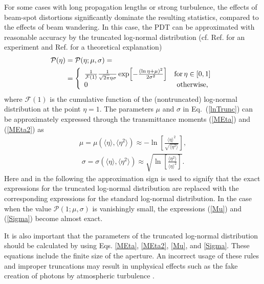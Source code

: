\documentclass[aps,pra,twocolumn,a4paper,nofootinbib,preprintnumbers] {revtex4-1}
\begin{document}
	For some cases with long propagation lengths or strong turbulence, the effects of beam-spot distortions significantly dominate  the resulting statistics, compared to the effects of beam wandering.
	In this case, the PDT can be approximated with  reasonable accuracy by the truncated log-normal distribution (cf. Ref. \cite{Capraro} for an experiment and Ref. \cite{Vasylyev2016} for a theoretical explanation)
		\begin{align}\label{lnTrunc}
		\mathcal{P}(\eta)&= \mathcal{P}(\eta;\mu,\sigma)=\nonumber\\
		&=\left\{\begin{array}{l c}
		\frac{1}{\mathcal{F}(1)}\frac{1}{\sqrt{2\pi}\eta\sigma}\exp\Bigl[-\frac{(\ln \eta+\mu )^2}{2\sigma^2}\Bigr]&\text{for}\,\eta\in[0,1]\\
		0&\text{otherwise,}
			\end{array}\right. 
		\end{align}
	where  $\mathcal{F}(1)$ is the cumulative function of the (nontruncated) log-normal distribution at the point $\eta{=}1$.
	The parameters $\mu$ and $\sigma$ in Eq.~(\ref{lnTrunc}) can be approximately expressed through the transmittance moments (\ref{MEta}) and (\ref{MEta2}) as
		\begin{align}\label{Mu}
		\mu=\mu(\langle\eta\rangle,\langle\eta^2\rangle)\approx-\ln\left[\frac{\langle\eta\rangle^2}{\sqrt{\langle\eta^2\rangle}}\right],
		\end{align}
		\begin{align}\label{Sigma}
		\sigma=\sigma(\langle\eta\rangle,\langle\eta^2\rangle)\approx\sqrt{\ln\left[\frac{\langle\eta^2\rangle}{\langle\eta\rangle^2}\right]}.
		\end{align}
	Here and in the following the approximation sign is used to signify that the exact expressions for the truncated log-normal distribution are replaced with the corresponding expressions for the standard log-normal distribution.
	In the case when the  value  $\mathcal{P}(1;\mu,\sigma)$ is vanishingly small, the expressions (\ref{Mu}) and (\ref{Sigma}) become almost exact.

	It is also important that the parameters of the truncated log-normal distribution should be calculated by using Eqs. \eqref{MEta}, \eqref{MEta2}, \eqref{Mu}, and \eqref{Sigma}.
	These equations include the finite size of the aperture.
	An incorrect usage of these rules and improper truncations may result in unphysical effects such as the fake creation of photons by atmospheric turbulence \cite{Perina1973}.
\end{document}
